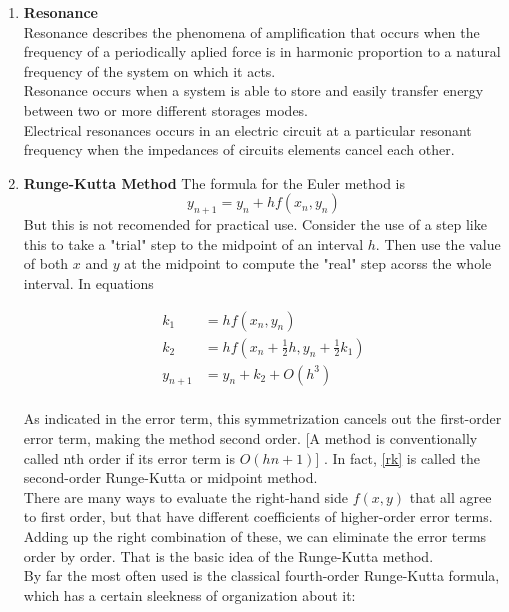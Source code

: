 \documentclass[10pt,a4paper]{article}
\begin{document}
\begin{multicols}{2}
\begin{enumerate}
\item \textbf{Resonance}\\
Resonance describes the phenomena of amplification that occurs when the frequency of a periodically aplied force is in harmonic proportion to a natural frequency of the system on which it acts.\\
Resonance occurs when a system is able to store and easily transfer energy between two or more different storages modes.\\
Electrical resonances occurs in an electric circuit at a particular resonant frequency when the impedances of circuits elements cancel each other.

\item \textbf{Runge-Kutta Method}
The formula for the Euler method is $$y_{n+1} = y_n + hf(x_n, y_n)$$ But this is not recomended for practical use. Consider the use of a step like this to take a "trial" step to the midpoint of an interval $h$. Then use the value of both $x$ and $y$ at the midpoint to compute the "real" step acorss the whole interval. In equations

\begin{align}
\nonumber k_1 &= hf(x_n, y_n) \\
\nonumber k_2 &= hf(x_n + \frac{1}{2}h,y_n + \frac{1}{2}k_1) \\
\nonumber y_{n+1} &= y_n + k_2 + O(h^3)\\
\label{rk}
\end{align}

As indicated in the error term, this symmetrization cancels out the first-order error term, making the method second order. [A method is conventionally called nth order if its error term is $O(hn+1)$] . In fact, \eqref{rk} is called the second-order Runge-Kutta or midpoint method.\\ 
There are many ways to evaluate the right-hand side $f(x,y)$ that all agree to first order, but that have different coefficients of higher-order error terms. Adding up the right combination of these, we can eliminate the error terms order by order. That is the basic idea of the Runge-Kutta method.\\
By far the most often used is the classical fourth-order Runge-Kutta formula, which has a certain sleekness of organization about it:


\end{enumerate}
\end{multicols}
\end{document}

